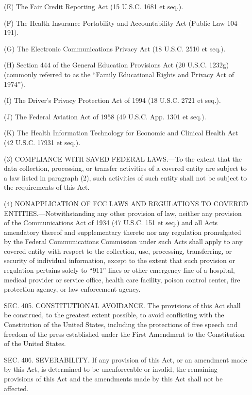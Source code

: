 (E) The Fair Credit Reporting Act (15 U.S.C. 1681 et seq.).

(F) The Health Insurance Portability and Accountability Act (Public Law 104–191).

(G) The Electronic Communications Privacy Act (18 U.S.C. 2510 et seq.).

(H) Section 444 of the General Education Provisions Act (20 U.S.C. 1232g) (commonly referred to as the “Family Educational Rights and Privacy Act of 1974”).

(I) The Driver's Privacy Protection Act of 1994 (18 U.S.C. 2721 et seq.).

(J) The Federal Aviation Act of 1958 (49 U.S.C. App. 1301 et seq.).

(K) The Health Information Technology for Economic and Clinical Health Act (42 U.S.C. 17931 et seq.).

(3) COMPLIANCE WITH SAVED FEDERAL LAWS.—To the extent that the data collection, processing, or transfer activities of a covered entity are subject to a law listed in paragraph (2), such activities of such entity shall not be subject to the requirements of this Act.

(4) NONAPPLICATION OF FCC LAWS AND REGULATIONS TO COVERED ENTITIES.—Notwithstanding any other provision of law, neither any provision of the Communications Act of 1934 (47 U.S.C. 151 et seq.) and all Acts amendatory thereof and supplementary thereto nor any regulation promulgated by the Federal Communications Commission under such Acts shall apply to any covered entity with respect to the collection, use, processing, transferring, or security of individual information, except to the extent that such provision or regulation pertains solely to “911” lines or other emergency line of a hospital, medical provider or service office, health care facility, poison control center, fire protection agency, or law enforcement agency.


SEC. 405. CONSTITUTIONAL AVOIDANCE.
The provisions of this Act shall be construed, to the greatest extent possible, to avoid conflicting with the Constitution of the United States, including the protections of free speech and freedom of the press established under the First Amendment to the Constitution of the United States.


SEC. 406. SEVERABILITY.
If any provision of this Act, or an amendment made by this Act, is determined to be unenforceable or invalid, the remaining provisions of this Act and the amendments made by this Act shall not be affected.

